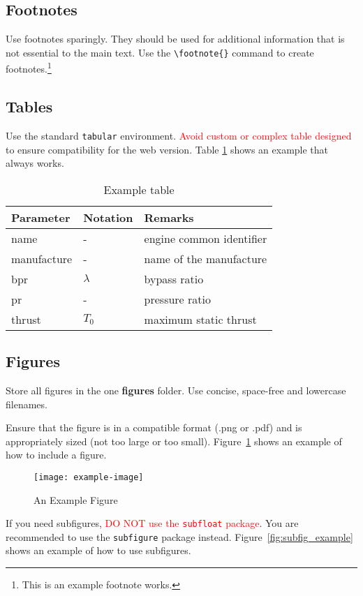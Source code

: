 \documentclass[
  manuscript=article,  %
  layout=preprint,  %
  year=20xx,
  volume=x,
]{extra/joas}
\begin{document}
\subsection{Footnotes}
Use footnotes sparingly. They should be used for additional information that is not essential to the main text. Use the \verb|\footnote{}| command to create footnotes.\footnote{This is an example footnote works.}

\subsection{Tables}
Use the standard \texttt{tabular} environment. \textcolor{red}{Avoid custom or complex table designed} to ensure compatibility for the web version. Table \ref{tb:example_table} shows an example that always works.

\begin{table}[htbp!]
  \centering
  \small
  \caption{Example table}
  \label{tb:example_table}
  \begin{tabular}{lll}
  \toprule
  \textbf{Parameter} & \textbf{Notation} & \textbf{Remarks} \\
  \midrule
  name & - & engine common identifier \\
  manufacture & - & name of the manufacture  \\
  bpr & $\lambda$ & bypass ratio \\
  pr & - & pressure ratio \\
  thrust & $T_0$ & maximum static thrust\\
  \bottomrule
  \end{tabular}
\end{table}

\subsection{Figures}
Store all figures in the one \textbf{figures} folder. Use concise, space-free and lowercase filenames.

Ensure that the figure is in a compatible format (.png or .pdf) and is appropriately sized (not too large or too small). Figure~\ref{fig:example} shows an example of how to include a figure. 

\begin{figure}[htbp!]
  \centering
  \texttt{[image: example-image]}
  \caption{An Example Figure}
  \label{fig:example}
\end{figure}

If you need subfigures, \textcolor{red}{DO NOT use the \texttt{subfloat} package}. You are recommended to use the \texttt{subfigure} package instead. Figure~\ref{fig:subfig_example} shows an example of how to use subfigures.
\end{document}
